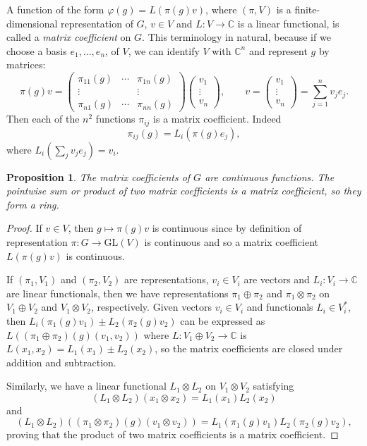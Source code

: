 \documentclass[12pt,reqno]{book}%
\newtheorem{proposition}{Proposition}[chapter]
\theoremstyle{definition}
\theoremstyle{remark}
\theoremstyle{theorem}
\theoremstyle{remark}
\begin{document}
A function of the form $\varphi(g) = L(\pi(g)v)$, where $(\pi, V)$ is a finite-dimensional representation of $G$, $v \in V$ and $L : V \to \mathbb{C}$ is a linear functional, is called a \emph{matrix coefficient} on $G$.
This terminology in natural, because if we choose a basis $e_1, \ldots, e_n$, of $V$, we can identify $V$ with $\mathbb{C}^{n}$ and represent $g$ by matrices:
\[
    \pi(g)v = %
    \begin{pmatrix}
        \pi_{11}(g) & \cdots & \pi_{1n}(g) \\
        \vdots      & \      & \vdots \\
        \pi_{n1}(g) & \cdots & \pi_{nn}(g)
    \end{pmatrix}
    \begin{pmatrix}
        v_1 \\
        \vdots \\
        v_n
    \end{pmatrix}
    , \qquad v = \begin{pmatrix}
        v_1 \\
        \vdots \\
        v_n
    \end{pmatrix}
    = \sum_{j=1}^{n} v_j e_j.
\]
Then each of the $n^2$ functions $\pi_{ij}$ is a matrix coefficient.
Indeed
\[
    \pi_{ij}(g) = L_i(\pi(g)e_j),
\]
where $L_i(\sum_{j} v_j e_j) = v_i$.

\begin{proposition}\label{propmatcoeffs}%
    The matrix coefficients of $G$ are continuous functions.
    The pointwise sum or product of two matrix coefficients is a matrix coefficient, so they form a ring.
\end{proposition}%
\begin{proof}%
    If $v \in V$, then $g \mapsto \pi(g)v$ is continuous since by definition of representation $\pi : G \to \mathrm{GL}(V)$ is continuous and so a matrix coefficient $L(\pi(g)v)$ is continuous.

    If $(\pi_1, V_1)$ and $(\pi_2, V_2)$ are representations, $v_i \in V_i$ are vectors and $L_i : V_i \to \mathbb{C}$ are linear functionals, then we have representations $\pi_1 \oplus \pi_2$ and $\pi_1 \otimes \pi_2$ on $V_1 \oplus V_2$ and $V_1 \otimes V_2$, respectively.
    Given vectors $v_i \in V_i$ and functionals $L_i \in V_i^*$, then $L_i(\pi_1(g)v_1) \pm L_2(\pi_2(g)v_2)$ can be expressed as $L((\pi_1 \oplus \pi_2)(g)(v_1, v_2))$ where $L : V_1 \oplus V_2 \to \mathbb{C}$ is $L(x_1, x_2) = L_1(x_1) \pm L_2(x_2)$, so the matrix coefficients are closed under addition and subtraction.

    Similarly, we have a linear functional $L_1 \otimes L_2$ on $V_1 \otimes V_2$ satisfying
    \[
        (L_1 \otimes L_2)(x_1 \otimes x_2) = L_1(x_1) L_2(x_2)
    \]
    and
    \[
        (L_1 \otimes L_2)((\pi_1 \otimes \pi_2)(g)(v_1 \otimes v_2)) = L_1(\pi_1(g)v_1)L_2(\pi_2(g)v_2),
    \]
    proving that the product of two matrix coefficients is a matrix coefficient.
\end{proof}%
\end{document}
